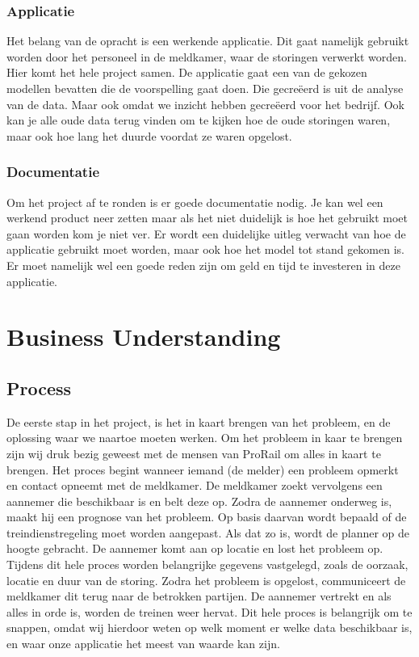 \documentclass{article}
\begin{document}
\subsubsection{Applicatie}
Het belang van de opracht is een werkende applicatie. Dit gaat namelijk gebruikt worden door het personeel in de meldkamer, waar de storingen verwerkt worden. Hier komt het hele project samen. De applicatie gaat een van de gekozen modellen bevatten die de voorspelling gaat doen. Die gecreëerd is uit de analyse van de data. Maar ook omdat we inzicht hebben gecreëerd voor het bedrijf. Ook kan je alle oude data terug vinden om te kijken hoe de oude storingen waren, maar ook hoe lang het duurde voordat ze waren opgelost.

\subsubsection{Documentatie}
Om het project af te ronden is er goede documentatie nodig. Je kan wel een werkend product neer zetten maar als het niet duidelijk is hoe het gebruikt moet gaan worden kom je niet ver. Er wordt een duidelijke uitleg verwacht van hoe de applicatie gebruikt moet worden, maar ook hoe het model tot stand gekomen is. Er moet namelijk wel een goede reden zijn om geld en tijd te investeren in deze applicatie.
 
\newpage
\section{Business Understanding}

\subsection{Process}
De eerste stap in het project, is het in kaart brengen van het probleem, en de oplossing waar we naartoe moeten werken. Om het probleem in kaar te brengen zijn wij druk bezig geweest met de mensen van ProRail om alles in kaart te brengen. Het proces begint wanneer iemand (de melder) een probleem opmerkt en contact opneemt met de meldkamer. De meldkamer zoekt vervolgens een aannemer die beschikbaar is en belt deze op. Zodra de aannemer onderweg is, maakt hij een prognose van het probleem. Op basis daarvan wordt bepaald of de treindienstregeling moet worden aangepast. Als dat zo is, wordt de planner op de hoogte gebracht. De aannemer komt aan op locatie en lost het probleem op. Tijdens dit hele proces worden belangrijke gegevens vastgelegd, zoals de oorzaak, locatie en duur van de storing. Zodra het probleem is opgelost, communiceert de meldkamer dit terug naar de betrokken partijen. De aannemer vertrekt en als alles in orde is, worden de treinen weer hervat. Dit hele proces is belangrijk om te snappen, omdat wij hierdoor weten op welk moment er welke data beschikbaar is, en waar onze applicatie het meest van waarde kan zijn.
\end{document}
